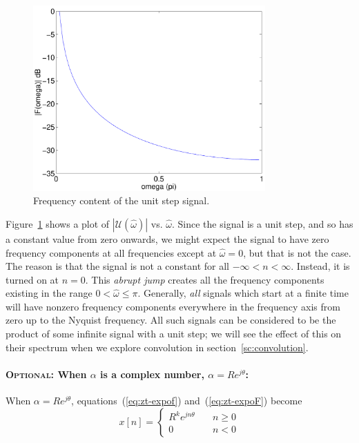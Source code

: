 \begin{figure}
\centerline{\includegraphics[width=3.5in]{ch-conv/zt_expo_r1F}}
\caption{Frequency content of the unit step signal.
\label{fig:zt-expo-r1F}}
\end{figure}

Figure~\ref{fig:zt-expo-r1F} shows a plot of
$|\mathcal{U}(\hat{\omega})|$ vs.  $\hat{\omega}$.  Since the signal
is a unit step, and so has a constant value from zero onwards, we
might expect the signal to have zero frequency components at all
frequencies except at $\hat{\omega}=0$, but that is not the case. The
reason is that the signal is not a constant for all $-\infty <n<
\infty$. Instead, it is turned on at $n=0$. This \emph{abrupt jump}
creates all the frequency components existing in the range
$0<\hat{\omega}\le\pi$. Generally, \emph{all} signals which start at a
finite time will have nonzero frequency components everywhere in the
frequency axis from zero up to the Nyquist frequency. All such signals
can be considered to be the product of some infinite signal with a
unit step; we will see the effect of this on their spectrum when we
explore convolution in section~\ref{sc:convolution}.

\paragraph*{\textsc{Optional:} When $\alpha$ is a complex number, $\alpha=Re^{j\theta}$:}

When $\alpha=Re^{j\theta}$, equations~(\ref{eq:zt-expof})
and~(\ref{eq:zt-expoF}) become
\begin{equation}
x[n] = \left\{\begin{array}{ll}
                        R^ke^{jn\theta} & \quad  n \ge 0 \\
                        0             & \quad n < 0
          \end{array}\right.
\end{equation}

